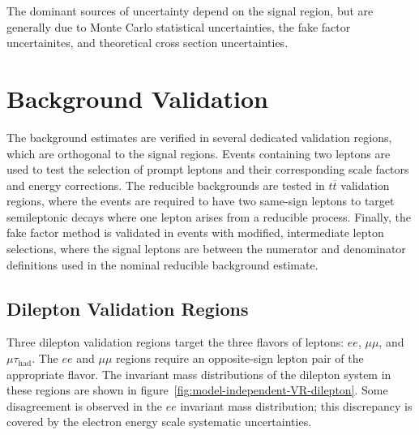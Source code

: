The dominant sources of uncertainty depend on the signal region, but are generally due to Monte Carlo statistical uncertainties, the fake factor uncertainites, and theoretical cross section uncertainties. 

\section{Background Validation}\label{sec:model-independent-validation-regions}
The background estimates are verified in several dedicated validation regions, which are orthogonal to the signal regions. Events containing two leptons are used to test the selection of prompt leptons and their corresponding scale factors and energy corrections. The reducible backgrounds are tested in $t\overline{t}$ validation regions, where the events are required to have two same-sign leptons to target semileptonic decays where one lepton arises from a reducible process. Finally, the fake factor method is validated in events with modified, intermediate lepton selections, where the signal leptons are between the numerator and denominator definitions used in the nominal reducible background estimate.

\subsection{Dilepton Validation Regions}\label{sec:model-independent-validation-regions-dilepton}
Three dilepton validation regions target the three flavors of leptons: $ee$, $\mu\mu$, and $\mu\tau_{\mathrm{had}}$. The $ee$ and $\mu\mu$ regions require an opposite-sign lepton pair of the appropriate flavor. The invariant mass distributions of the dilepton system in these regions are shown in figure~\ref{fig:model-independent-VR-dilepton}. Some disagreement is observed in the $ee$ invariant mass distribution; this discrepancy is covered by the electron energy scale systematic uncertainties. 

